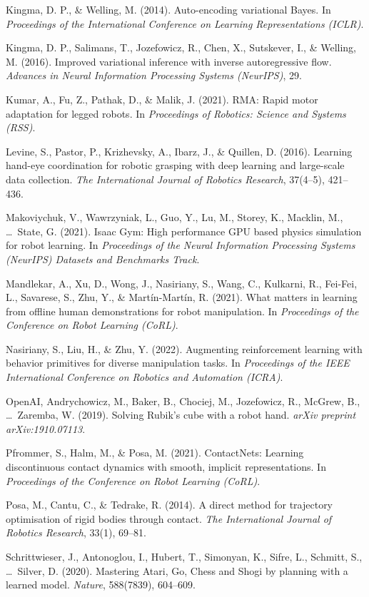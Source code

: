 \documentclass[12pt,a4paper,oneside]{report}
\begin{document}
Kingma, D. P., \& Welling, M. (2014). Auto-encoding variational Bayes. In \emph{Proceedings of the International Conference on Learning Representations (ICLR)}.

Kingma, D. P., Salimans, T., Jozefowicz, R., Chen, X., Sutskever, I., \& Welling, M. (2016). Improved variational inference with inverse autoregressive flow. \emph{Advances in Neural Information Processing Systems (NeurIPS)}, 29.

Kumar, A., Fu, Z., Pathak, D., \& Malik, J. (2021). RMA: Rapid motor adaptation for legged robots. In \emph{Proceedings of Robotics: Science and Systems (RSS)}.

Levine, S., Pastor, P., Krizhevsky, A., Ibarz, J., \& Quillen, D. (2016). Learning hand-eye coordination for robotic grasping with deep learning and large-scale data collection. \emph{The International Journal of Robotics Research}, 37(4--5), 421--436.

Makoviychuk, V., Wawrzyniak, L., Guo, Y., Lu, M., Storey, K., Macklin, M., \ldots~State, G. (2021). Isaac Gym: High performance GPU based physics simulation for robot learning. In \emph{Proceedings of the Neural Information Processing Systems (NeurIPS) Datasets and Benchmarks Track}.

Mandlekar, A., Xu, D., Wong, J., Nasiriany, S., Wang, C., Kulkarni, R., Fei-Fei, L., Savarese, S., Zhu, Y., \& Mart\'in-Mart\'in, R. (2021). What matters in learning from offline human demonstrations for robot manipulation. In \emph{Proceedings of the Conference on Robot Learning (CoRL)}.

Nasiriany, S., Liu, H., \& Zhu, Y. (2022). Augmenting reinforcement learning with behavior primitives for diverse manipulation tasks. In \emph{Proceedings of the IEEE International Conference on Robotics and Automation (ICRA)}.

OpenAI, Andrychowicz, M., Baker, B., Chociej, M., Jozefowicz, R., McGrew, B., \ldots~Zaremba, W. (2019). Solving Rubik's cube with a robot hand. \emph{arXiv preprint arXiv:1910.07113}.

Pfrommer, S., Halm, M., \& Posa, M. (2021). ContactNets: Learning discontinuous contact dynamics with smooth, implicit representations. In \emph{Proceedings of the Conference on Robot Learning (CoRL)}.

Posa, M., Cantu, C., \& Tedrake, R. (2014). A direct method for trajectory optimisation of rigid bodies through contact. \emph{The International Journal of Robotics Research}, 33(1), 69--81.

Schrittwieser, J., Antonoglou, I., Hubert, T., Simonyan, K., Sifre, L., Schmitt, S., \ldots~Silver, D. (2020). Mastering Atari, Go, Chess and Shogi by planning with a learned model. \emph{Nature}, 588(7839), 604--609.
\end{document}
